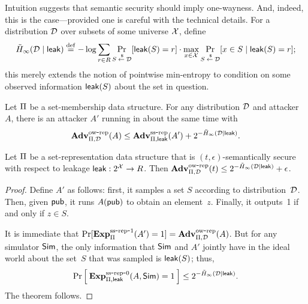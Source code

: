 Intuition suggests that semantic security should imply one-wayness. And, indeed, this is
the case---provided one is careful with the technical details.
For a distribution ${\cal D}$
over subsets of some universe ${\cal X}$, define
\[\tilde H_\infty({\cal D} \mid {\sf leak}) \stackrel{\rm def}{=} -\log \sum_{r \in R} \Pr_{S {\:\stackrel{{\scriptscriptstyle \hspace{0.2em}\$}} {\leftarrow}\:} {\cal D}}[{\sf leak}(S)=r] \cdot
\max_{x \in {\cal X}} \Pr_{S {\:\stackrel{{\scriptscriptstyle \hspace{0.2em}\$}} {\leftarrow}\:} {\cal D}}[x \in S \mid {\sf leak}(S)=r];\]
this merely extends the notion of pointwise min-entropy to condition on some
observed information ${\sf leak}(S)$ about the set in question.

\begin{theorem}
Let $\Pi$ be a set-membership data structure. For any distribution ${\cal D}$ and
attacker~$A$, there is an attacker $A'$ running in about the same time with
\[\mathrm{\mathbf{Adv}}^{\mathrm{ow\mbox{-}rep}}_{\Pi,\mathcal{D}}(A) \leq \mathrm{\mathbf{Adv}}^{\mathrm{ss\mbox{-}rep}}_{\Pi,{\sf leak}}(A') + 2^{-\tilde H_\infty({\cal D} \mid {\sf leak})}.\]
\begin{theorem}
Let $\Pi$ be a set-representation data structure that is $(t, \epsilon)$-semantically secure
with respect to leakage ${\sf leak}:2^{\cal X} \rightarrow R$.
Then $\mathrm{\mathbf{Adv}}^{\mathrm{ow\mbox{-}rep}}_{\Pi,\mathcal{D}}(t) \leq 2^{-\tilde H_\infty({\cal D} \mid {\sf leak})} + \epsilon$.
\end{theorem}
\begin{proof}
Define $A'$ as follows: first, it samples a set $S$ according to
distribution~${\cal D}$. Then, given ${\sf pub}$, it runs $A({\sf pub})$ to obtain an element~$z$.
Finally, it outputs~1 if and only if $z \in S$.

It is immediate that $\Pr[\mathrm{\mathbf{Exp}}^{\mathrm{ss\mbox{-}rep\mbox{-}1}}_{\Pi}(A')=1] = \mathrm{\mathbf{Adv}}^{\mathrm{ow\mbox{-}rep}}_{\Pi,\mathcal{D}}(A)$.
But for any simulator ${\sf Sim}$,
the only information
that ${\sf Sim}$
and $A'$ jointly have in the ideal world
about the set~$S$ that was sampled is ${\sf leak}(S)$; thus,
\[\Pr\left[\: \mathrm{\mathbf{Exp}}^{\mathrm{ss\mbox{-}rep\mbox{-}0}}_{\Pi,{\sf leak}}(A, {\sf Sim})=1 \:\right] \leq
2^{-\tilde H_\infty({\cal D} \mid {\sf leak})}.\]
The theorem follows.
\end{proof}



\end{theorem}
